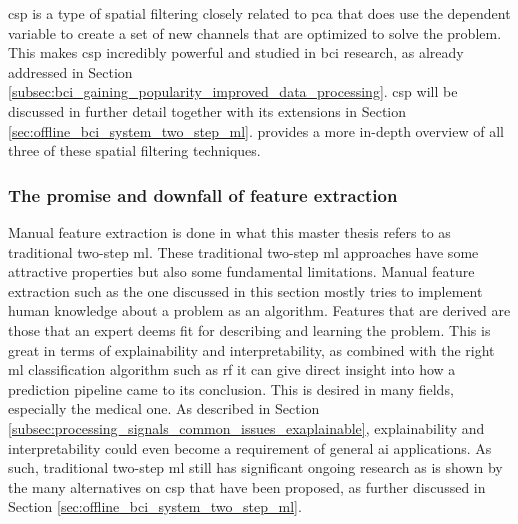 \Gls{csp} is a type of spatial filtering closely related to \gls{pca} that does use the dependent variable to create a set of new channels that are optimized to solve the problem.
This makes \gls{csp} incredibly powerful and studied in \gls{bci} research, as already addressed in Section \ref{subsec:bci_gaining_popularity_improved_data_processing}.
\Gls{csp} will be discussed in further detail together with its extensions in Section \ref{sec:offline_bci_system_two_step_ml}.
 provides a more in-depth overview of all three of these spatial filtering techniques.


\subsubsection{The promise and downfall of feature extraction}
\label{subsubsec:processing_signals_general_pipeline_features_dl_link}

Manual feature extraction is done in what this master thesis refers to as traditional two-step \gls{ml}. 
These traditional two-step \gls{ml} approaches have some attractive properties but also some fundamental limitations.
Manual feature extraction such as the one discussed in this section mostly tries to implement human knowledge about a problem as an algorithm.
Features that are derived are those that an expert deems fit for describing and learning the problem.
This is great in terms of explainability and interpretability, as combined with the right \gls{ml} classification algorithm such as \gls{rf} it can give direct insight into how a prediction pipeline came to its conclusion.
This is desired in many fields, especially the medical one.
As described in Section \ref{subsec:processing_signals_common_issues_exaplainable}, explainability and interpretability could even become a requirement of general \gls{ai} applications.
As such, traditional two-step \gls{ml} still has significant ongoing research as is shown by the many alternatives on \gls{csp} that have been proposed, as further discussed in Section \ref{sec:offline_bci_system_two_step_ml}.

